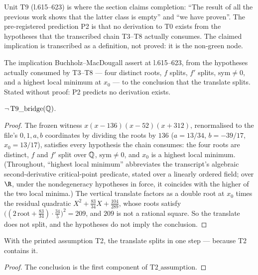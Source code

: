 Unit $\mathrm{T9}$ (l.615--623) is where the section claims completion: ``The result of
all the previous work shows that the latter class is empty'' and ``we have proven''.
The pre-registered prediction P2 is that no derivation to T0 exists from the hypotheses
that the transcribed chain T3--T8 actually consumes.  The claimed implication is
transcribed as a definition, not proved: it is the non-green node.

\begin{definition}\label{T9_bridge}
The implication Buchholz--MacDougall assert at l.615--623, from the hypotheses actually
consumed by T3--T8 --- four distinct roots, $f$ splits, $f'$ splits, $\mathrm{sym}\neq 0$,
and a highest local minimum at $x_{0}$ --- to the conclusion that the translate splits.
Stated without proof: P2 predicts no derivation exists.
\end{definition}

\begin{theorem}\label{not_T9_bridge_Q}\leanok
{}
$\neg\,\mathrm{T9\_bridge}(\mathbb{Q})$.
\end{theorem}
\begin{proof}\leanok
{}
The frozen witness $x(x-136)(x-52)(x+312)$, renormalised to the file's $0,1,a,b$
coordinates by dividing the roots by $136$ ($a=13/34$, $b=-39/17$, $x_{0}=13/17$),
satisfies every hypothesis the chain consumes: the four roots are distinct, $f$ and
$f'$ split over $\mathbb{Q}$, $\mathrm{sym}\neq 0$, and $x_{0}$ is a highest local minimum.
(Throughout, ``highest local minimum'' abbreviates the transcript's algebraic
second-derivative critical-point predicate, stated over a linearly ordered field; over
$\R$, under the nondegeneracy hypotheses in force, it coincides with the higher of the
two local minima.)  The
vertical translate factors as a double root at $x_{0}$ times the residual quadratic
$X^{2}+\tfrac{83}{34}X+\tfrac{104}{289}$, whose roots satisfy
$\bigl((2\,\text{root}+\tfrac{83}{34})\cdot\tfrac{34}{5}\bigr)^{2}=209$, and $209$ is not
a rational square.  So the translate does not split, and the hypotheses do not imply the
conclusion.
\end{proof}

\begin{theorem}\label{T9_via_T2}\leanok
{}
With the printed assumption T2, the translate splits in one step --- because T2 contains
it.
\end{theorem}
\begin{proof}\leanok
The conclusion is the first component of $\mathrm{T2\_assumption}$.
\end{proof}

